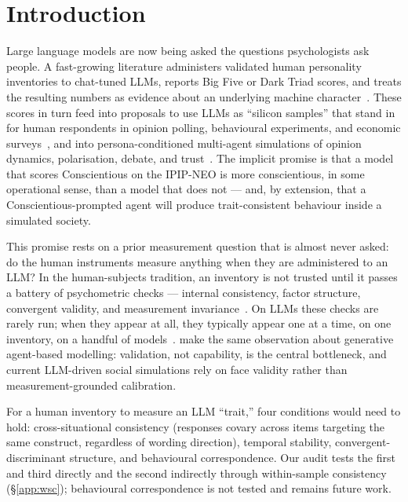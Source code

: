 \documentclass[11pt]{article}
\begin{document}
\section{Introduction}
\label{sec:intro}

Large language models are now being asked the questions psychologists ask people. A fast-growing literature administers validated human personality inventories to chat-tuned LLMs, reports Big Five or Dark Triad scores, and treats the resulting numbers as evidence about an underlying machine character~\citep{miotto2023gpt3,serapio2025psychometric,jiang2023personallm,huang2023psychobench,bodroza2024personality}. These scores in turn feed into proposals to use LLMs as ``silicon samples'' that stand in for human respondents in opinion polling, behavioural experiments, and economic surveys~\citep{argyle2023one,horton2023homo,aher2023using,park2023generative,ferreira2025matching}, and into persona-conditioned multi-agent simulations of opinion dynamics, polarisation, debate, and trust~\citep{chuang2023simulating,cau2025language,chuang2025debate,mannekote2025roleplaying}. The implicit promise is that a model that scores Conscientious on the IPIP-NEO is more conscientious, in some operational sense, than a model that does not --- and, by extension, that a Conscientious-prompted agent will produce trait-consistent behaviour inside a simulated society.

This promise rests on a prior measurement question that is almost never asked: do the human instruments measure anything when they are administered to an LLM? In the human-subjects tradition, an inventory is not trusted until it passes a battery of psychometric checks --- internal consistency, factor structure, convergent validity, and measurement invariance~\citep{cronbach1951coefficient,kaiser1960application,vandenberg2000review}. On LLMs these checks are rarely run; when they appear at all, they typically appear one at a time, on one inventory, on a handful of models~\citep{suhr2025challenging,pelet2025persistent}. \citet{larooij2025validation} make the same observation about generative agent-based modelling: validation, not capability, is the central bottleneck, and current LLM-driven social simulations rely on face validity rather than measurement-grounded calibration.

For a human inventory to measure an LLM ``trait,'' four conditions would need to hold: cross-situational consistency (responses covary across items targeting the same construct, regardless of wording direction), temporal stability, convergent-discriminant structure, and behavioural correspondence. Our audit tests the first and third directly and the second indirectly through within-sample consistency (\S\ref{app:wsc}); behavioural correspondence is not tested and remains future work.
\end{document}
